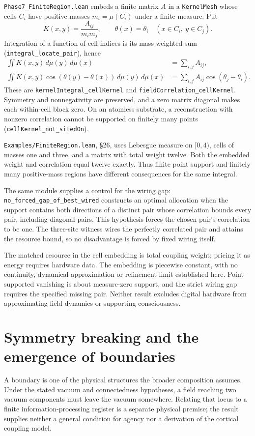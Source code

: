 \documentclass{article}
\begin{document}
\nolinkurl{Phase7_FiniteRegion.lean} embeds a finite matrix $A$
in a \texttt{KernelMesh} whose cells $C_i$ have positive masses
$m_i=\mu(C_i)$ under a finite measure. Put
\[
 K(x,y)=\frac{A_{ij}}{m_i m_j},\qquad
 \theta(x)=\theta_i\quad(x\in C_i,\ y\in C_j).
\]
Integration of a function of cell indices is its mass-weighted sum
(\nolinkurl{integral_locate_pair}), hence
\begin{align}
 \iint K(x,y)\,d\mu(y)\,d\mu(x)&=\sum_{i,j}A_{ij},\\
 \iint K(x,y)\cos(\theta(y)-\theta(x))\,d\mu(y)\,d\mu(x)
   &=\sum_{i,j}A_{ij}\cos(\theta_j-\theta_i).
 \label{eq:finite-region-preservation}
\end{align}
These are \nolinkurl{kernelIntegral_cellKernel} and
\nolinkurl{fieldCorrelation_cellKernel}. Symmetry and
nonnegativity are preserved, and a zero matrix diagonal makes each
within-cell block zero. On an atomless substrate, a reconstruction with
nonzero correlation cannot be supported on finitely many points
(\nolinkurl{cellKernel_not_sitedOn}).

\nolinkurl{Examples/FiniteRegion.lean}, \S26, uses Lebesgue measure
on $[0,4)$, cells of masses one and three, and a matrix with total weight
twelve. Both the embedded weight and correlation equal twelve exactly.
Thus finite point support and finitely many positive-mass regions have
different consequences for the same integral.

The same module supplies a control for the wiring gap:
\nolinkurl{no_forced_gap_of_best_wired}
constructs an optimal allocation when the support contains both directions of
a distinct pair whose correlation bounds every pair, including diagonal
pairs. This hypothesis forces the chosen pair's correlation to be one.
The three-site witness wires the perfectly correlated pair and attains the
resource bound, so no disadvantage is forced by fixed wiring itself.

The matched resource in the cell embedding is total coupling weight; pricing
it as energy requires hardware data. The embedding is piecewise constant,
with no continuity, dynamical approximation or refinement limit established
here. Point-supported vanishing is about measure-zero support, and the strict
wiring gap requires the specified missing pair. Neither result excludes
digital hardware from approximating field dynamics or supporting consciousness.

\section{Symmetry breaking and the emergence of boundaries}
\label{sec:supp-boundaries}
A boundary is one of the physical structures the broader composition assumes. Under the stated vacuum and connectedness hypotheses, a field reaching two vacuum components must leave the vacuum somewhere. Relating that locus to a finite information-processing register is a separate physical premise; the result supplies neither a general condition for agency nor a derivation of the cortical coupling model.
\end{document}
